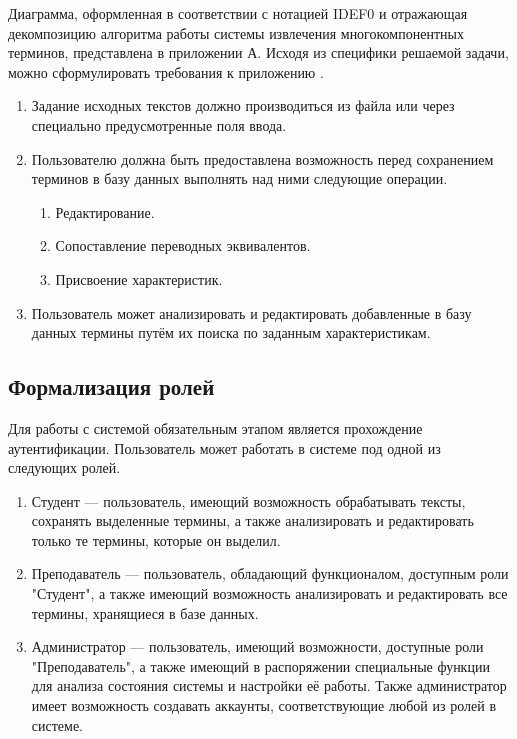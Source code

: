 Диаграмма, оформленная в соответствии с нотацией IDEF0 и отражающая декомпозицию алгоритма работы системы извлечения многокомпонентных терминов, представлена в приложении А. Исходя из специфики решаемой задачи, можно сформулировать требования к приложению \cite{My_article_2022}.


\begin{enumerate}[label*=\arabic*.]
	\item Задание исходных текстов должно производиться из файла или через специально предусмотренные поля ввода.
	\item Пользователю должна быть предоставлена возможность перед сохранением терминов в базу данных выполнять над ними следующие операции.
	
	\begin{enumerate}[label*=\arabic*.]
		\item Редактирование.
		\item Сопоставление переводных эквивалентов.
		\item Присвоение характеристик.
		
	\end{enumerate}

	\item Пользователь может анализировать и редактировать добавленные в базу данных термины путём их поиска по заданным характеристикам.
	
\end{enumerate}



\subsection{Формализация ролей}

Для работы с системой обязательным этапом является прохождение аутентификации. Пользователь может работать в системе под одной из следующих ролей.

\begin{enumerate}[label*=\arabic*.]
	\item Студент --- пользователь, имеющий возможность обрабатывать тексты, сохранять выделенные термины, а также анализировать и редактировать только те термины, которые он выделил.
	\item Преподаватель --- пользователь, обладающий функционалом, доступным роли "Студент", а также имеющий возможность анализировать и редактировать все термины, хранящиеся в базе данных.
	\item Администратор --- пользователь, имеющий возможности, доступные роли "Преподаватель", а также имеющий в распоряжении специальные функции для анализа состояния системы и настройки её работы. Также администратор имеет возможность создавать аккаунты, соответствующие любой из ролей в системе.
	
\end{enumerate}

